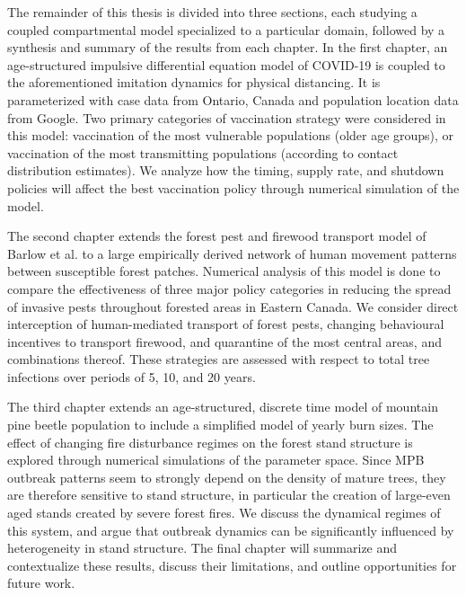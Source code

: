 The remainder of this thesis is divided into three sections, each studying a coupled compartmental model specialized to a particular domain, followed by a synthesis and summary of the results from each chapter. In the first chapter, an age-structured impulsive differential equation model of COVID-19 is coupled to the aforementioned imitation dynamics for physical distancing. It is parameterized with case data from Ontario, Canada and population location data from Google. Two primary categories of vaccination strategy were considered in this model: vaccination of the most vulnerable populations (older age groups), or vaccination of the most transmitting populations (according to contact distribution estimates). We analyze how the timing, supply rate, and shutdown policies will affect the best vaccination policy through numerical simulation of the model.

The second chapter extends the forest pest and firewood transport model of Barlow et al. \cite{barlow2014modelling} to a large empirically derived network of human movement patterns between susceptible forest patches. Numerical analysis of this model is done to compare the effectiveness of three major policy categories in reducing the spread of invasive pests throughout forested areas in Eastern Canada. We consider direct interception of human-mediated transport of forest pests, changing behavioural incentives to transport firewood, and quarantine of the most central areas, and combinations thereof. These strategies are assessed with respect to total tree infections over periods of 5, 10, and 20 years.

The third chapter extends an age-structured, discrete time model of mountain pine beetle population \cite{duncan2015model} to include a simplified model of yearly burn sizes. The effect of changing fire disturbance regimes on the forest stand structure is explored through numerical simulations of the parameter space. Since MPB outbreak patterns seem to strongly depend on the density of mature trees, they are therefore sensitive to stand structure, in particular the creation of large-even aged stands created by severe forest fires. We discuss the dynamical regimes of this system, and argue that outbreak dynamics can be significantly influenced by heterogeneity in stand structure. The final chapter will summarize and contextualize these results, discuss their limitations, and outline opportunities for future work.